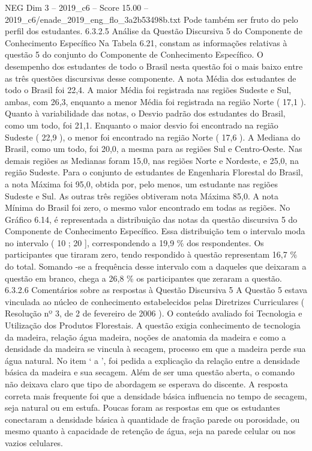 \begin{textsample}{NEG Dim 3 – 2019\_c6 – Score 15.00 – 2019\_c6/enade\_2019\_eng\_flo\_3a2b53498b.txt}
Pode também ser fruto do pelo perfil dos estudantes. 6.3.2.5 Análise da Questão Discursiva 5 do Componente de Conhecimento Específico Na Tabela 6.21, constam as informações relativas à questão 5 do conjunto do Componente de Conhecimento Específico.
O desempenho dos estudantes de todo o Brasil nesta questão foi o mais baixo entre as três questões discursivas desse componente.
A nota Média dos estudantes de todo o Brasil foi 22,4.
A maior Média foi registrada nas regiões Sudeste e Sul, ambas, com 26,3, enquanto a menor Média foi registrada na região Norte ( 17,1 ).
Quanto à variabilidade das notas, o Desvio padrão dos estudantes do Brasil, como um todo, foi 21,1.
Enquanto o maior desvio foi encontrado na região Sudeste ( 22,9 ), o menor foi encontrado na região Norte ( 17,6 ).
A Mediana do Brasil, como um todo, foi 20,0, a mesma para as regiões Sul e Centro-Oeste.
Nas demais regiões as Medianas foram 15,0, nas regiões Norte e Nordeste, e 25,0, na região Sudeste.
Para o conjunto de estudantes de Engenharia Florestal do Brasil, a nota Máxima foi 95,0, obtida por, pelo menos, um estudante nas regiões Sudeste e Sul.
As outras três regiões obtiveram nota Máxima 85,0.
A nota Mínima do Brasil foi zero, o mesmo valor encontrado em todas as regiões.
No Gráfico 6.14, é representada a distribuição das notas da questão discursiva 5 do Componente de Conhecimento Específico.
Essa distribuição tem o intervalo moda no intervalo ( 10 ; 20 ], correspondendo a 19,9 \% dos respondentes.
Os participantes que tiraram zero, tendo respondido à questão representam 16,7 \% do total.
Somando -se a frequência desse intervalo com a daqueles que deixaram a questão em branco, chega a 26,8 \% os participantes que zeraram a questão. 6.3.2.6 Comentários sobre as respostas à Questão Discursiva 5 A Questão 5 estava vinculada ao núcleo de conhecimento estabelecidos pelas Diretrizes Curriculares ( Resolução nº 3, de 2 de fevereiro de 2006 ).
O conteúdo avaliado foi Tecnologia e Utilização dos Produtos Florestais.
A questão exigia conhecimento de tecnologia da madeira, relação água madeira, noções de anatomia da madeira e como a densidade da madeira se vincula à secagem, processo em que a madeira perde sua água natural.
No item ‘ a ’, foi pedida a explicação da relação entre a densidade básica da madeira e sua secagem.
Além de ser uma questão aberta, o comando não deixava claro que tipo de abordagem se esperava do discente.
A resposta correta mais frequente foi que a densidade básica influencia no tempo de secagem, seja natural ou em estufa.
Poucas foram as respostas em que os estudantes conectaram a densidade básica à quantidade de fração parede ou porosidade, ou mesmo quanto à capacidade de retenção de água, seja na parede celular ou nos vazios celulares.

\end{textsample}
